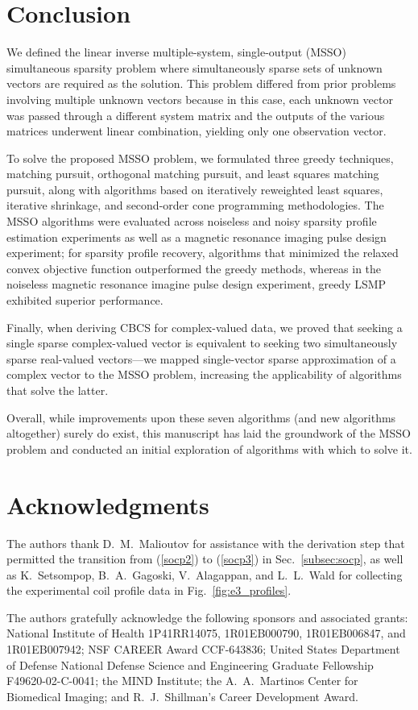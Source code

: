 \documentclass[final]{siamltex}
\begin{document}
\section{Conclusion}
\label{sec:conclusion}

  We defined the linear inverse multiple-system, single-output (MSSO)
  simultaneous sparsity problem where simultaneously sparse sets of
  unknown vectors are required as the solution.  This problem differed
  from prior problems involving multiple unknown vectors because in
  this case, each unknown vector was passed through a different system
  matrix and the outputs of the various matrices underwent linear
  combination, yielding only one observation vector.

  To solve the proposed MSSO problem, we formulated three greedy
  techniques, matching pursuit, orthogonal matching pursuit, and least
  squares matching pursuit, along with algorithms based on iteratively
  reweighted least squares, iterative shrinkage, and second-order cone
  programming methodologies. The MSSO algorithms were evaluated across
  noiseless and noisy sparsity profile estimation experiments as well
  as a magnetic resonance imaging pulse design experiment; for
  sparsity profile recovery, algorithms that minimized the relaxed
  convex objective function outperformed the greedy methods, whereas
  in the noiseless magnetic resonance imagine pulse design experiment,
  greedy LSMP exhibited superior performance.

  Finally, when deriving CBCS for complex-valued data, we proved that
  seeking a single sparse complex-valued vector is equivalent to
  seeking two simultaneously sparse real-valued vectors---we mapped
  single-vector sparse approximation of a complex vector to the MSSO
  problem, increasing the applicability of algorithms that solve the
  latter.

  Overall, while improvements upon these seven algorithms (and new
  algorithms altogether) surely do exist, this manuscript has laid the
  groundwork of the MSSO problem and conducted an initial exploration
  of algorithms with which to solve it.

\section*{Acknowledgments} 

   The authors thank D.~M.~Malioutov for assistance with the
   derivation step that permitted the transition from (\ref{socp2}) to
   (\ref{socp3}) in Sec.~\ref{subsec:socp}, as well as K.~Setsompop,
   B.~A.~Gagoski, V.~Alagappan, and L.~L.~Wald for collecting the
   experimental coil profile data in Fig.~\ref{fig:e3_profiles}.

   The authors gratefully acknowledge the
   following sponsors and associated grants: National Institute of Health
   1P41RR14075, 1R01EB000790, 1R01EB006847, and 1R01EB007942; NSF
   CAREER Award CCF-643836; United States Department of Defense
   National Defense Science and Engineering Graduate Fellowship
   F49620-02-C-0041; the MIND Institute; the A.~A.~Martinos Center for
   Biomedical Imaging; and R.~J.~Shillman's Career Development Award.



\end{document}
